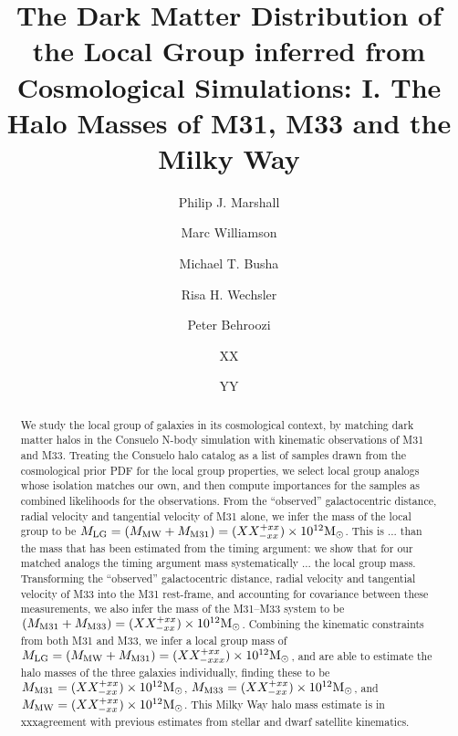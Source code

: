 \documentclass{emulateapj}
\newcommand{\MMW}{{\rm M}_{\rm MW}}
\newcommand{\Msun}{{\rm M}_\odot}
\newcommand{\consuelo}{{\sc Consuelo }}
\def\MLG{M_{\rm LG}}
\def\MMW{M_{\rm MW}}
\def\MEI{M_{\rm M31}}
\def\MEE{M_{\rm M33}}
\def\MPAIRestimate{XX}
\def\MPAIRerrorplus{xx}
\def\MPAIRerrorminus{xx}
\def\MbAestimate{XX}
\def\MbAerrorplus{xx}
\def\MbAerrorminus{xx}
\def\MTRIPLETestimate{XX}
\def\MTRIPLETerrorplus{xx}
\def\MTRIPLETerrorminus{xxx}
\def\MEIestimate{XX}
\def\MEIerrorplus{xx}
\def\MEIerrorminus{xx}
\def\MEEestimate{XX}
\def\MEEerrorplus{xx}
\def\MEEerrorminus{xx}
\def\MMWestimate{XX}
\def\MMWerrorplus{xx}
\def\MMWerrorminus{xx}
\begin{document}
\title{The Dark Matter Distribution of the Local Group inferred from
Cosmological Simulations: I. The Halo Masses of M31, M33 and the Milky Way}

\author{Philip J. Marshall}
\author{Marc Williamson}
\author{Michael T. Busha} 
\author{Risa H. Wechsler}
\author{Peter Behroozi}
\author{XX}
\author{YY}


\begin{abstract} 

We study the local group of galaxies in its cosmological context, by matching
dark matter halos in the \consuelo N-body simulation with kinematic
observations of M31 and M33. Treating the \consuelo halo  catalog as a list of
samples drawn from the cosmological prior PDF for the local group properties,
we select local group analogs whose isolation matches our own, and then
compute importances for the samples as combined likelihoods for the
observations. 
%
From the ``observed'' galactocentric distance, radial velocity and tangential 
velocity of M31 alone, we infer the mass of the local group to be $\MLG =
(\MMW + \MEI) = (\MPAIRestimate^{+\MPAIRerrorplus}_{-\MPAIRerrorminus}) \times
10^{12} \Msun$. This is ... than the mass that has been estimated from the
timing argument: we show that for our matched analogs the timing argument mass
systematically ... the local group mass. 
%
Transforming the ``observed'' galactocentric distance, radial velocity and
tangential  velocity of M33 into the M31 rest-frame, and accounting for
covariance between these measurements, we also infer the mass of the M31--M33
system to be  $(\MEI + \MEE) =
(\MbAestimate^{+\MbAerrorplus}_{-\MbAerrorminus}) \times 10^{12} \Msun$.
%
Combining the kinematic constraints from both M31 and M33,  we infer a local
group mass of $\MLG = (\MMW + \MEI) =
(\MTRIPLETestimate^{+\MTRIPLETerrorplus}_{-\MTRIPLETerrorminus}) \times
10^{12} \Msun$, and are able to estimate the halo masses of the three galaxies
individually, finding these to be $\MEI =
(\MEIestimate^{+\MEIerrorplus}_{-\MEIerrorminus}) \times 10^{12} \Msun$, $\MEE
= (\MEEestimate^{+\MEEerrorplus}_{-\MEEerrorminus}) \times 10^{12} \Msun$, 
and $\MMW = (\MMWestimate^{+\MMWerrorplus}_{-\MMWerrorminus}) \times 10^{12}
\Msun$. 
%
This Milky Way halo mass estimate is in xxxagreement with previous estimates
from stellar and dwarf satellite kinematics.

\end{abstract}
\end{document}
